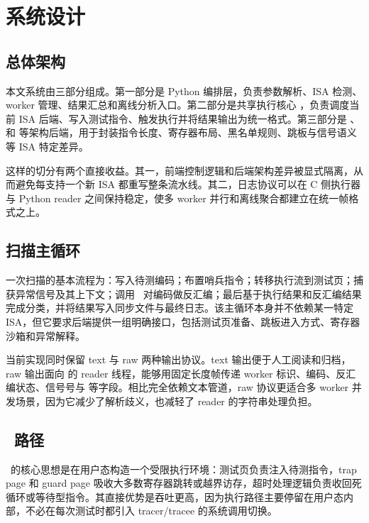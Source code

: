 \chapter{系统设计}

\section{总体架构}

本文系统由三部分组成。第一部分是 Python 编排层，负责参数解析、ISA 检测、worker 管理、结果汇总和离线分析入口。第二部分是共享执行核心 ，负责调度当前 ISA 后端、写入测试指令、触发执行并将结果输出为统一格式。第三部分是 、 和  等架构后端，用于封装指令长度、寄存器布局、黑名单规则、跳板与信号语义等 ISA 特定差异。

这样的切分有两个直接收益。其一，前端控制逻辑和后端架构差异被显式隔离，从而避免每支持一个新 ISA 都重写整条流水线。其二，日志协议可以在 C 侧执行器与 Python reader 之间保持稳定，使多 worker 并行和离线聚合都建立在统一帧格式之上。

\section{扫描主循环}

一次扫描的基本流程为：写入待测编码；布置哨兵指令；转移执行流到测试页；捕获异常信号及其上下文；调用 \capstone\ 对编码做反汇编；最后基于执行结果和反汇编结果完成分类，并将结果写入同步文件与最终日志。该主循环本身并不依赖某一特定 ISA，但它要求后端提供一组明确接口，包括测试页准备、跳板进入方式、寄存器沙箱和异常解释。

当前实现同时保留 text 与 raw 两种输出协议。text 输出便于人工阅读和归档，raw 输出面向  的 reader 线程，能够用固定长度帧传递 worker 标识、编码、反汇编状态、信号号与  等字段。相比完全依赖文本管道，raw 协议更适合多 worker 并发场景，因为它减少了解析歧义，也减轻了 reader 的字符串处理负担。

\section{\memcage\ 路径}

\memcage\ 的核心思想是在用户态构造一个受限执行环境：测试页负责注入待测指令，trap page 和 guard page 吸收大多数寄存器跳转或越界访存，超时处理逻辑负责收回死循环或等待型指令。其直接优势是吞吐更高，因为执行路径主要停留在用户态内部，不必在每次测试时都引入 tracer/tracee 的系统调用切换。

